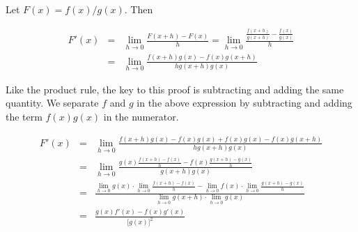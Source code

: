 \documentclass[12pt]{article}
\begin{document}
Let $F(x) = f(x)/g(x)$.  Then

\begin{eqnarray*}
F'(x) & = & \lim_{h \to0} \frac{F(x+h)-F(x)}{h} = \lim_{h \to0} \frac{\frac{f(x+h)}{g(x+h)}-\frac{f(x)}{g(x)}}{h}\\
& = & \lim_{h\to0} \frac{f(x+h)g(x)-f(x)g(x+h)}{hg(x+h)g(x)}
\end{eqnarray*}

Like the product rule, the key to this proof is subtracting and adding the same quantity.  We separate $f$ and $g$ in the above expression by subtracting and adding the term $f(x)g(x)$ in the numerator.

\begin{eqnarray*}
F'(x) & = & \lim_{h \to0} \frac{f(x+h)g(x)-f(x)g(x)+f(x)g(x)-f(x)g(x+h)}{hg(x+h)g(x)} \\
& = & \lim_{h \to0} \frac{g(x)\frac{f(x+h)-f(x)}{h}-f(x) \frac{g(x+h)-g(x)}{h}}{g(x+h)g(x)} \\
& = & \frac{\lim_{h \to0}g(x) \cdot \lim_{h \to0} \frac{f(x+h)-f(x)}{h}-\lim_{h \to0} f(x) \cdot \lim_{h \to0} \frac{g(x+h)-g(x)}{h}}{\lim_{h \to0}g(x+h) \cdot \lim_{h \to0}g(x)} \\
& = & \frac{g(x)f'(x)-f(x)g'(x)}{\lbrack g(x) \rbrack ^2}
\end{eqnarray*}
\end{document}
